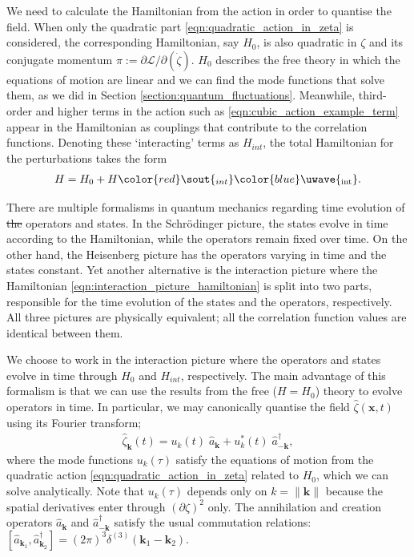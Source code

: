 \documentclass[a4paper,12pt,times,custombib,print,index]{Classes/PhDThesisPSnPDF} %
\newcommand{\Lagr}{\mathcal{L}}		\newcommand{\Hami}{\mathcal{H}}		\newcommand{\vv}{\mathbf}			\newcommand{\pluseq}{\mathrel{+}=}	%
\providecommand{\DIFadd}[1]{{\protect\color{blue}\uwave{#1}}} %
\providecommand{\DIFdel}[1]{{\protect\color{red}\sout{#1}}}                      %
\providecommand{\DIFaddbegin}{} %
\providecommand{\DIFaddend}{} %
\providecommand{\DIFdelbegin}{} %
\providecommand{\DIFdelend}{} %
\newcommand{\DIFscaledelfig}{0.5}
\newlength{\DIFdelgraphicswidth} %
\newlength{\DIFdelgraphicsheight} %
\newcommand{\DIFaddincludegraphics}[2][]{{\color{blue}\fbox{\DIFOincludegraphics[#1]{#2}}}} %
\newcommand{\DIFdelincludegraphics}[2][]{%
\sbox{\DIFdelgraphicsbox}{\DIFOincludegraphics[#1]{#2}}%
\settoboxwidth{\DIFdelgraphicswidth}{\DIFdelgraphicsbox} %
\settoboxtotalheight{\DIFdelgraphicsheight}{\DIFdelgraphicsbox} %
\scalebox{\DIFscaledelfig}{%
\parbox[b]{\DIFdelgraphicswidth}{\usebox{\DIFdelgraphicsbox}\\[-\baselineskip] \rule{\DIFdelgraphicswidth}{0em}}\llap{\resizebox{\DIFdelgraphicswidth}{\DIFdelgraphicsheight}{%
\setlength{\unitlength}{\DIFdelgraphicswidth}%
\begin{picture}(1,1)%
\thicklines\linethickness{2pt} %
{\color[rgb]{1,0,0}\put(0,0){\framebox(1,1){}}}%
{\color[rgb]{1,0,0}\put(0,0){\line( 1,1){1}}}%
{\color[rgb]{1,0,0}\put(0,1){\line(1,-1){1}}}%
\end{picture}%
}\hspace*{3pt}}} %
} %
\DeclareRobustCommand{\DIFaddbegin}{\DIFOaddbegin \let\includegraphics\DIFaddincludegraphics} %
\DeclareRobustCommand{\DIFaddend}{\DIFOaddend \let\includegraphics\DIFOincludegraphics} %
\DeclareRobustCommand{\DIFdelbegin}{\DIFOdelbegin \let\includegraphics\DIFdelincludegraphics} %
\DeclareRobustCommand{\DIFdelend}{\DIFOaddend \let\includegraphics\DIFOincludegraphics} %
\begin{document}
We need to calculate the Hamiltonian from the action in order to quantise the field. When only the quadratic part \eqref{eqn:quadratic_action_in_zeta} is considered, the corresponding Hamiltonian, say $H_0$, is also quadratic in $\zeta$ and its conjugate momentum $\pi := \partial\Lagr/\partial(\dot{\zeta})$. $H_0$ describes the free theory in which the equations of motion are linear and we can find the mode functions that solve them, as we did in Section \ref{section:quantum_fluctuations}. Meanwhile, third-order and higher terms in the action such as \eqref{eqn:cubic_action_example_term} appear in the Hamiltonian as couplings that contribute to the correlation functions. Denoting these `interacting' terms as \DIFdelbegin \DIFdel{$H_{int}$}\DIFdelend \DIFaddbegin \DIFadd{$H_\text{int}$}\DIFaddend , the total Hamiltonian for the perturbations takes the form
\begin{align}
	H = H_0 + H\DIFdelbegin \DIFdel{_{int}}\DIFdelend \DIFaddbegin \DIFadd{_\text{int}}\DIFaddend . \label{eqn:interaction_picture_hamiltonian}
\end{align}

There are multiple formalisms in quantum mechanics regarding \DIFaddbegin \DIFadd{the }\DIFaddend time evolution of \DIFdelbegin \DIFdel{the }\DIFdelend operators and states. In the Schr\"odinger picture, the states evolve in time according to the Hamiltonian, while the operators remain fixed over time. On the other hand, the Heisenberg picture has the operators varying in time and the states constant. Yet another alternative is the interaction picture where the Hamiltonian \eqref{eqn:interaction_picture_hamiltonian} is split into two parts, responsible for the time evolution of the states and the operators, respectively. All three pictures are physically equivalent; all the correlation function values are identical between them.

We choose to work in the interaction picture where the operators and states evolve in time through $H_0$ and \DIFdelbegin \DIFdel{$H_{int}$}\DIFdelend \DIFaddbegin \DIFadd{$H_\text{int}$}\DIFaddend , respectively. The main advantage of this formalism is that we can use the results from the free ($H=H_0$) theory to evolve operators in time. In particular, we may canonically quantise the field $\hat{\zeta}(\vv{x},t)$ using its Fourier transform;
\begin{align}
	\hat{\zeta}_\vv{k} (t) = u_k(t) \; \hat{a}_\vv{k} + u_k^*(t) \; \hat{a}_{-\vv{k}}^\dagger, \label{eqn:zeta_canonical_quantisation}
\end{align} 
where the mode functions $u_k(\tau)$ satisfy the equations of motion from the quadratic action \eqref{eqn:quadratic_action_in_zeta} related to $H_0$, which we can solve analytically. Note that $u_k(\tau)$ depends only on $k=\|\vv{k}\|$ because the spatial derivatives enter through $(\partial\zeta)^2$ only. The annihilation and creation operators $\hat{a}_\vv{k}$ and $\hat{a}_{-\vv{k}}^\dagger$ satisfy the usual commutation relations: \DIFdelbegin \DIFdel{$[\hat{a}_{\vv{k}_1},\hat{a}_{\vv{k}_2}^\dagger] = (2\pi)^3 \delta^{(3)}(\vv{k}_1-\vv{k}_2)$}\DIFdelend \DIFaddbegin \DIFadd{${[\hat{a}_{\vv{k}_1},\hat{a}_{\vv{k}_2}^\dagger] = (2\pi)^3 \delta^{(3)}(\vv{k}_1-\vv{k}_2)}$}\DIFaddend .
\end{document}
